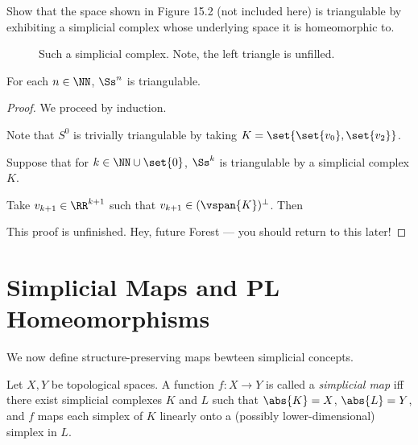 \begin{problem}[15.15]
  Show that the space shown in Figure 15.2 (not included here) is triangulable
  by exhibiting a simplicial complex whose underlying space it is homeomorphic
  to.
\end{problem}
\begin{solution}
  \begin{figure}[H]
    \centering
    \caption{Such a simplicial complex. Note, the left triangle is unfilled.}
  \end{figure}
\end{solution}
\begin{problem}[15.6]
  For each $n \in \NN$, $\Ss^n$ is triangulable.
\end{problem}
\begin{proof}
  We proceed by induction.

  \begin{induction}
    \item Note that $S^0$ is trivially triangulable by taking $K =
      \set{\set{v_0}, \set{v_2}}$.
    \item Suppose that for $k \in \NN \cup \set{0}$, $\Ss^k$ is triangulable by
      a simplicial complex $K$.
    \item Take $v_{k+1} \in \RR^{k+1}$ such that $v_{k+1} \in
      (\vspan{K})^\perp$. Then
  \end{induction}
  {\color{red} This proof is unfinished. Hey, future Forest --- you should
    return to this later!}
\end{proof}
\section{Simplicial Maps and PL Homeomorphisms}
We now define structure-preserving maps bewteen simplicial concepts.
\begin{definition}
  Let $X,Y$ be topological spaces. A function $f : X \to Y$ is called a
  \emph{simplicial map} iff there exist simplicial complexes $K$ and $L$ such
  that $\abs{K} = X$, $\abs{L} = Y$, and $f$ maps each simplex of $K$ linearly
  onto a (possibly lower-dimensional) simplex in $L$.
\end{definition}

